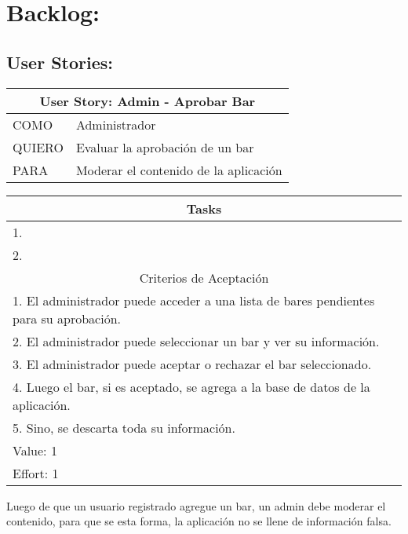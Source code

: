 \section{Backlog:}

\subsection{User Stories:}

    \begin{table}[H]
        \centering
        \begin{tabular}{| p{1.5cm}| p{10.2cm} |}
            \hline
            \multicolumn{2}{|c|}{User Story: Admin - Aprobar Bar} \\
            \hline
            COMO & Administrador \\ \hline
            QUIERO & Evaluar la aprobación de un bar \\ \hline
            PARA & Moderar el contenido de la aplicación \\ \hline
            \hline
        \end{tabular}
        \begin{tabular}{| p{12.118cm} |}
            \multicolumn{1}{|c|}{Tasks} \\
            \hline
            1.  \\ \hline
            2.  \\ \hline
            \hline
            \multicolumn{1}{|c|}{Criterios de Aceptación} \\
            \hline
            1. El administrador puede acceder a una lista de bares pendientes para su aprobación. \\ \hline
            2. El administrador puede seleccionar un bar y ver su información. \\ \hline
            3. El administrador puede aceptar o rechazar el bar seleccionado. \\ \hline
            4. Luego el bar, si es aceptado, se agrega a la base de datos de la aplicación. \\ \hline
            5. Sino, se descarta toda su información. \\ \hline
            Value: 1 \\ \hline
            Effort: 1 \\ \hline
        \end{tabular}
    \end{table}
    
     Luego de que un usuario registrado agregue un bar, un admin debe moderar el contenido, para que se esta forma, la aplicación no se llene de información falsa. \\
    
